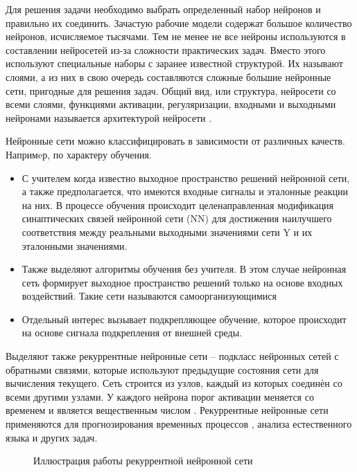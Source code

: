 Для решения задачи необходимо выбрать определенный набор
нейронов и правильно их соединить. Зачастую рабочие модели содержат большое количество нейронов, исчисляемое тысячами.
Тем не менее не все нейроны используются в составлении нейросетей из-за сложности практических задач. Вместо этого используют специальные
наборы с заранее известной структурой. Их называют слоями, а из них в
свою очередь составляются сложные большие нейронные сети, пригодные
для решения задач. Общий вид, или структура, нейросети со всеми слоями,
функциями активации, регуляризации, входными и выходными нейронами
называется архитектурой нейросети \cite{cyber_alex}.

Нейронные сети можно классифицировать в зависимости от различных качеств. Напримeр, по характеру обучения.
\begin{itemize}
	\item С учителем когда известно выходное пространство решений нейронной сети, а также предполагается, что имеются входные сигналы и
эталонные реакции на них. В процессе обучения происходит целенаправленная модификация синаптических связей нейронной сети (NN)
для достижения наилучшего соответствия между реальными выходными значениями сети Y и их эталонными значениями.
	\item Также выделяют алгоритмы обучения без учителя. В этом случае нейронная сеть формирует выходное
	пространство решений только на основе входных воздействий. Такие
	сети называются самоорганизующимися
	\item Отдельный интерес вызывает подкрепляющее обучение, которое происходит на основе сигнала подкрепления от внешней среды.
\end{itemize}

Выделяют также рекуррентные нейронные сети -- подкласс нейронных сетей с обратными связями, которые
используют предыдущие состояния сети для вычисления текущего. Сеть строится из узлов, каждый
из которых соединѐн со всеми другими узлами. У каждого нейрона порог активации меняется со
временем и является вещественным числом \cite{bguir_rnn}. 
Рекуррентные нейронные сети применяются для прогнозирования временных процессов \cite{bgu_krasn}, анализа естественного языка и других задач.
\begin{figure}[H]
	\caption{Иллюстрация работы рекуррентной нейронной сети}
\end{figure}

